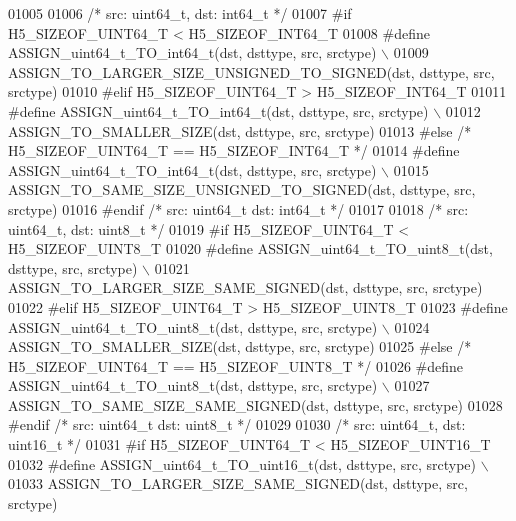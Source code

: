 \begin{DoxyCode}
01005 
01006 \textcolor{comment}{/* src: uint64\_t, dst: int64\_t */}
01007 \textcolor{preprocessor}{#if H5\_SIZEOF\_UINT64\_T < H5\_SIZEOF\_INT64\_T}
01008 \textcolor{preprocessor}{    #define ASSIGN\_uint64\_t\_TO\_int64\_t(dst, dsttype, src, srctype) \(\backslash\)}
01009 \textcolor{preprocessor}{        ASSIGN\_TO\_LARGER\_SIZE\_UNSIGNED\_TO\_SIGNED(dst, dsttype, src, srctype)}
01010 \textcolor{preprocessor}{#elif H5\_SIZEOF\_UINT64\_T > H5\_SIZEOF\_INT64\_T}
01011 \textcolor{preprocessor}{    #define ASSIGN\_uint64\_t\_TO\_int64\_t(dst, dsttype, src, srctype) \(\backslash\)}
01012 \textcolor{preprocessor}{        ASSIGN\_TO\_SMALLER\_SIZE(dst, dsttype, src, srctype)}
01013 \textcolor{preprocessor}{#else }\textcolor{comment}{/* H5\_SIZEOF\_UINT64\_T == H5\_SIZEOF\_INT64\_T */}\textcolor{preprocessor}{}
01014 \textcolor{preprocessor}{    #define ASSIGN\_uint64\_t\_TO\_int64\_t(dst, dsttype, src, srctype) \(\backslash\)}
01015 \textcolor{preprocessor}{        ASSIGN\_TO\_SAME\_SIZE\_UNSIGNED\_TO\_SIGNED(dst, dsttype, src, srctype)}
01016 \textcolor{preprocessor}{#endif }\textcolor{comment}{/* src: uint64\_t dst: int64\_t */}\textcolor{preprocessor}{}
01017 
01018 \textcolor{comment}{/* src: uint64\_t, dst: uint8\_t */}
01019 \textcolor{preprocessor}{#if H5\_SIZEOF\_UINT64\_T < H5\_SIZEOF\_UINT8\_T}
01020 \textcolor{preprocessor}{    #define ASSIGN\_uint64\_t\_TO\_uint8\_t(dst, dsttype, src, srctype) \(\backslash\)}
01021 \textcolor{preprocessor}{        ASSIGN\_TO\_LARGER\_SIZE\_SAME\_SIGNED(dst, dsttype, src, srctype)}
01022 \textcolor{preprocessor}{#elif H5\_SIZEOF\_UINT64\_T > H5\_SIZEOF\_UINT8\_T}
01023 \textcolor{preprocessor}{    #define ASSIGN\_uint64\_t\_TO\_uint8\_t(dst, dsttype, src, srctype) \(\backslash\)}
01024 \textcolor{preprocessor}{        ASSIGN\_TO\_SMALLER\_SIZE(dst, dsttype, src, srctype)}
01025 \textcolor{preprocessor}{#else }\textcolor{comment}{/* H5\_SIZEOF\_UINT64\_T == H5\_SIZEOF\_UINT8\_T */}\textcolor{preprocessor}{}
01026 \textcolor{preprocessor}{    #define ASSIGN\_uint64\_t\_TO\_uint8\_t(dst, dsttype, src, srctype) \(\backslash\)}
01027 \textcolor{preprocessor}{        ASSIGN\_TO\_SAME\_SIZE\_SAME\_SIGNED(dst, dsttype, src, srctype)}
01028 \textcolor{preprocessor}{#endif }\textcolor{comment}{/* src: uint64\_t dst: uint8\_t */}\textcolor{preprocessor}{}
01029 
01030 \textcolor{comment}{/* src: uint64\_t, dst: uint16\_t */}
01031 \textcolor{preprocessor}{#if H5\_SIZEOF\_UINT64\_T < H5\_SIZEOF\_UINT16\_T}
01032 \textcolor{preprocessor}{    #define ASSIGN\_uint64\_t\_TO\_uint16\_t(dst, dsttype, src, srctype) \(\backslash\)}
01033 \textcolor{preprocessor}{        ASSIGN\_TO\_LARGER\_SIZE\_SAME\_SIGNED(dst, dsttype, src, srctype)}

\end{DoxyCode}
